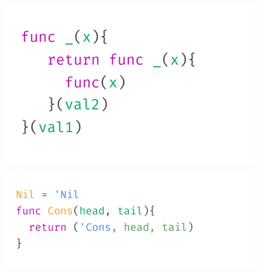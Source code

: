 \documentclass[a1,portrait]{a1poster}
\begin{document}
\begin{multicols}{2}
\begin{multicols}{3}
\begin{minipage}[b]{1\linewidth}
\begin{center}
\includegraphics[width=0.9\linewidth, trim={0.2cm 0.2cm 0.2cm 0.3cm}, clip]{figs/let-by-im-call.png}
\vspace{-0.65cm}
\end{center}
\end{minipage}
\end{multicols}

\vspace{-1cm}

\begin{multicols}{2}

\begin{minipage}[b]{1\linewidth}
\begin{center}\vspace{0.1cm}
    \includegraphics[width=1\linewidth, trim={0.1cm 0.1cm 0.1cm 0.1cm}, clip]{figs/tagged-union-impl.png}
    \vspace{-1.5cm}
\end{center}
\end{minipage}



\end{multicols}
\end{multicols}
\end{document}
